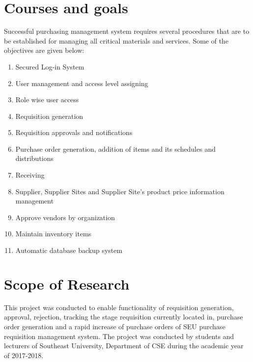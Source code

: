 \documentclass[12pt]{report} %
\begin{document}
\section{Courses and goals}
Successful purchasing management system requires several procedures that are to be established for managing all critical materials and services. Some of the objectives are given below: 
\renewcommand{\labelenumi}{\alph{enumi})}
\begin{enumerate}
		\item Secured Log-in System	
		\item User management and access level assigning
		\item Role wise user access
		\item Requisition generation
		\item Requisition approvals and notifications
		\item Purchase order generation, addition of items and its schedules and distributions 
		\item Receiving 
		\item Supplier, Supplier Sites and Supplier Site's product price information management
		\item Approve vendors by organization
		\item Maintain inventory items
		\item Automatic database backup system
\end{enumerate}




\ifx %
\section{Scope of Research}
This project was conducted  to enable functionality of requisition generation, approval, rejection, tracking the stage requisition currently located in, purchase order generation and a rapid increase of purchase orders of SEU purchase requisition management system. The project was conducted by students and lecturers of Southeast University, Department of CSE during the academic year of 2017-2018.
\fi%
\ifx %
\end{document}
